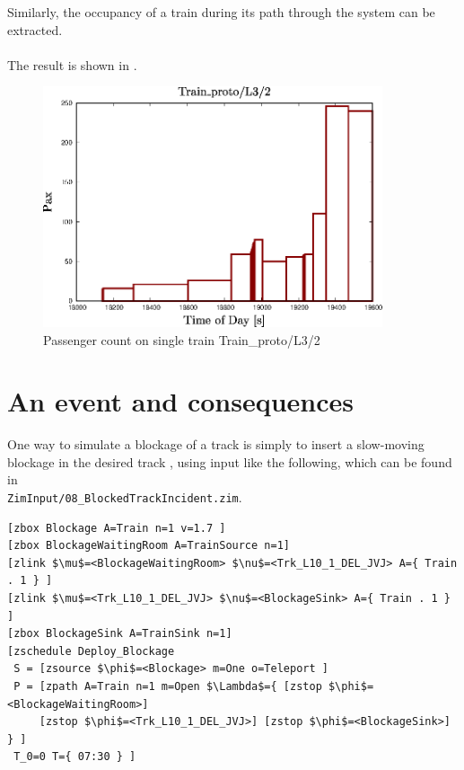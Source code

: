 Similarly, the occupancy of a train during its path through the system can be extracted.\\
 \\
The result is shown in . 
\begin{figure}[!ht]
  \centering
  \includegraphics[angle=0,width=10cm]{90_figs/_Occupancy_Train_proto_L3_2.eps}
  \caption{Passenger count on single train Train\_proto/L3/2}
  \label{SingleTrain}
\end{figure}

\section{An event and consequences}
\label{sec:incident}
One way to simulate a blockage of a track is simply to insert a slow-moving blockage
in the desired track , using input like the following, which
can be found in \\{\tt ZimInput/08\_BlockedTrackIncident.zim}.
\begin{lstlisting}[mathescape]
[zbox Blockage A=Train n=1 v=1.7 ]
[zbox BlockageWaitingRoom A=TrainSource n=1]
[zlink $\mu$=<BlockageWaitingRoom> $\nu$=<Trk_L10_1_DEL_JVJ> A={ Train . 1 } ]
[zlink $\mu$=<Trk_L10_1_DEL_JVJ> $\nu$=<BlockageSink> A={ Train . 1 } ]
[zbox BlockageSink A=TrainSink n=1]
[zschedule Deploy_Blockage
 S = [zsource $\phi$=<Blockage> m=One o=Teleport ]
 P = [zpath A=Train n=1 m=Open $\Lambda$={ [zstop $\phi$=<BlockageWaitingRoom>]
     [zstop $\phi$=<Trk_L10_1_DEL_JVJ>] [zstop $\phi$=<BlockageSink>] } ]
 T_0=0 T={ 07:30 } ]
\end{lstlisting}

